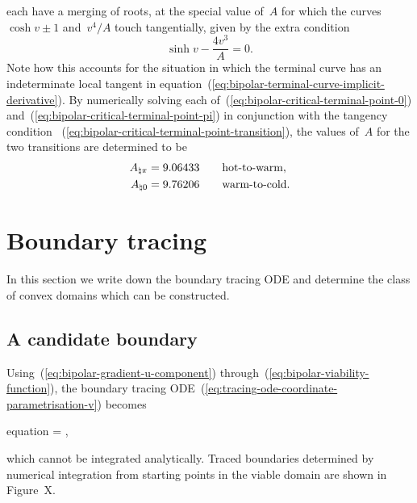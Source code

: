 each have a merging of roots,
at the special value of~$A$
for which the curves~$\cosh v \pm 1$ and~$v^4 / A$
touch tangentially,
given by the extra condition
\begin{equation}
  \sinh v - \frac{4 v^3}{A} = 0.
  \label{eq:bipolar-critical-terminal-point-transition}
\end{equation}
Note how this accounts for the situation in which
the terminal curve has an indeterminate local tangent
in equation~(\ref{eq:bipolar-terminal-curve-implicit-derivative}).
By numerically solving each of~(\ref{eq:bipolar-critical-terminal-point-0})
and~(\ref{eq:bipolar-critical-terminal-point-pi})
in conjunction with the tangency condition~%
  (\ref{eq:bipolar-critical-terminal-point-transition}),
the values of~$A$ for the two transitions are determined to be
\begin{align}
  A_{\natural \pi} &= 9.06433 \qquad \text{hot-to-warm},
    \label{eq:bipolar-transition-a-hot-to-warm}
    \\
  A_{\natural 0} &= 9.76206 \qquad \text{warm-to-cold}.
    \label{eq:bipolar-transition-a-warm-to-cold}
\end{align}

\section{Boundary tracing}
\label{sec:bipolar.tracing}

In this section we write down the boundary tracing ODE
and determine the class of convex domains which can be constructed.

\subsection{A candidate boundary}
\label{sec:bipolar.tracing.candidate}

Using~(\ref{eq:bipolar-gradient-u-component})
through~(\ref{eq:bipolar-viability-function}),
the boundary tracing ODE~(\ref{eq:tracing-ode-coordinate-parametrisation-v})
becomes
\begin{important}{equation}
   =
    \pm
    ,
  \label{eq:bipolar-tracing-ode-coordinate-parametrisation-v}
\end{important}
which cannot be integrated analytically.
Traced boundaries determined by numerical integration
from starting points in the viable domain
are shown in Figure~X. %

